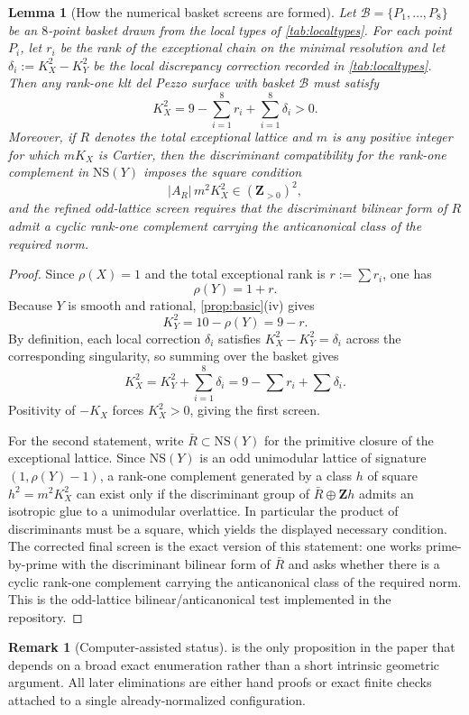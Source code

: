 \documentclass[11pt]{article}
\newtheorem{lemma}[theorem]{Lemma}
\theoremstyle{definition}
\newtheorem{remark}[theorem]{Remark}
\newcommand{\NS}{\mathrm{NS}}
\begin{document}
\begin{lemma}[How the numerical basket screens are formed]\label{lem:basket-screens}
Let $\mathcal B=\{P_1,\dots,P_8\}$ be an $8$-point basket drawn from the local types of \cref{tab:localtypes}. For each point $P_i$, let $r_i$ be the rank of the exceptional chain on the minimal resolution and let $\delta_i:=K_X^2-K_Y^2$ be the local discrepancy correction recorded in \cref{tab:localtypes}. Then any rank-one klt del Pezzo surface with basket $\mathcal B$ must satisfy
\[
K_X^2 = 9-\sum_{i=1}^8 r_i + \sum_{i=1}^8 \delta_i > 0.
\]
Moreover, if $R$ denotes the total exceptional lattice and $m$ is any positive integer for which $mK_X$ is Cartier, then the discriminant compatibility for the rank-one complement in $\NS(Y)$ imposes the square condition
\[
|A_R|\,m^2K_X^2\in (\mathbf Z_{>0})^2,
\]
and the refined odd-lattice screen requires that the discriminant bilinear form of $R$ admit a cyclic rank-one complement carrying the anticanonical class of the required norm.
\end{lemma}

\begin{proof}
Since $\rho(X)=1$ and the total exceptional rank is $r:=\sum r_i$, one has
\[
\rho(Y)=1+r.
\]
Because $Y$ is smooth and rational, \cref{prop:basic}(iv) gives
\[
K_Y^2 = 10-\rho(Y)=9-r.
\]
By definition, each local correction $\delta_i$ satisfies $K_X^2-K_Y^2=\delta_i$ across the corresponding singularity, so summing over the basket gives
\[
K_X^2 = K_Y^2+\sum_{i=1}^8 \delta_i = 9-\sum r_i+\sum \delta_i.
\]
Positivity of $-K_X$ forces $K_X^2>0$, giving the first screen.

For the second statement, write $\bar R\subset \NS(Y)$ for the primitive closure of the exceptional lattice. Since $\NS(Y)$ is an odd unimodular lattice of signature $(1,\rho(Y)-1)$, a rank-one complement generated by a class $h$ of square $h^2=m^2K_X^2$ can exist only if the discriminant group of $\bar R\oplus \mathbf Zh$ admits an isotropic glue to a unimodular overlattice. In particular the product of discriminants must be a square, which yields the displayed necessary condition. The corrected final screen is the exact version of this statement: one works prime-by-prime with the discriminant bilinear form of $\bar R$ and asks whether there is a cyclic rank-one complement carrying the anticanonical class of the required norm. This is the odd-lattice bilinear/anticanonical test implemented in the repository.
\end{proof}

\begin{remark}[Computer-assisted status]\label{rem:computer-assisted}
 is the only proposition in the paper that depends on a broad exact enumeration rather than a short intrinsic geometric argument. All later eliminations are either hand proofs or exact finite checks attached to a single already-normalized configuration.
\end{remark}
\end{document}
